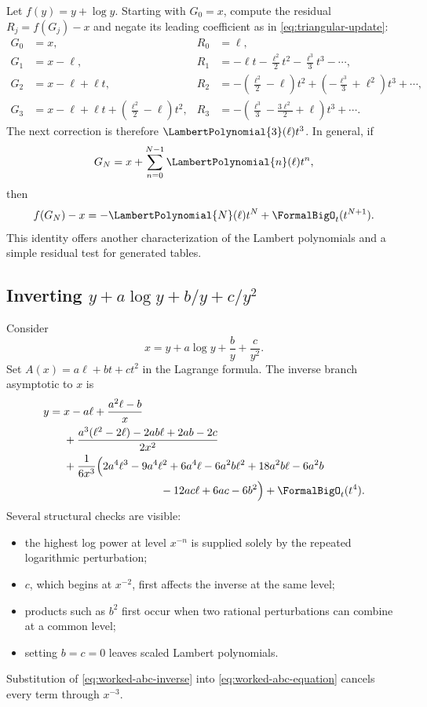 \documentclass[11pt,oneside]{article}
\numberwithin{equation}{section}
\theoremstyle{definition}
\begin{document}
Let \(f(y)=y+\log y\).  Starting with \(G_0=x\), compute the residual
\(R_j=f(G_j)-x\) and negate its leading coefficient as in
\eqref{eq:triangular-update}:
\begin{align*}
 G_0&=x,
 &R_0&=\ell,\\
 G_1&=x-\ell,
 &R_1&=-\ell t-\frac{\ell^2}{2}t^2-\frac{\ell^3}{3}t^3-\cdots,\\
 G_2&=x-\ell+\ell t,
 &R_2&=-\left(\frac{\ell^2}{2}-\ell\right)t^2
      +\left(-\frac{\ell^3}{3}+\ell^2\right)t^3+\cdots,\\
 G_3&=x-\ell+\ell t+
       \left(\frac{\ell^2}{2}-\ell\right)t^2,
 &R_3&=-\left(\frac{\ell^3}{3}-\frac{3\ell^2}{2}+\ell\right)t^3
      +\cdots.
\end{align*}
The next correction is therefore \(\LambertPolynomial{3}(\ell)t^3\).  In general, if
\[
  G_N=x+\sum_{n=0}^{N-1}\LambertPolynomial{n}(\ell)t^n,
\]
then
\begin{equation}\label{eq:Lambert-residual-staircase}
  f(G_N)-x=-\LambertPolynomial{N}(\ell)t^N+\FormalBigO_t(t^{N+1}).
\end{equation}
This identity offers another characterization of the Lambert polynomials and a
simple residual test for generated tables.

\subsection{Inverting \(y+a\log y+b/y+c/y^2\)}

Consider
\begin{equation}\label{eq:worked-abc-equation}
  x=y+a\log y+\frac{b}{y}+\frac{c}{y^2}.
\end{equation}
Set \(A(x)=a\ell+bt+ct^2\) in the Lagrange formula.  The inverse branch
asymptotic to \(x\) is
\begin{align}
 y={}&x-a\ell
 +\frac{a^2\ell-b}{x}\nonumber\\
 &+\frac{a^3(\ell^2-2\ell)-2ab\ell+2ab-2c}{2x^2}
 \nonumber\\
 &+\frac{1}{6x^3}\Bigl(
 2a^4\ell^3-9a^4\ell^2+6a^4\ell
 -6a^2b\ell^2+18a^2b\ell-6a^2b\nonumber\\
 &\hspace{31mm}-12ac\ell+6ac-6b^2\Bigr)
 +\FormalBigO_t(t^4).
 \label{eq:worked-abc-inverse}
\end{align}
Several structural checks are visible:
\begin{itemize}
\item the highest log power at level \(x^{-n}\) is supplied solely by the
  repeated logarithmic perturbation;
\item \(c\), which begins at \(x^{-2}\), first affects the inverse at the same
  level;
\item products such as \(b^2\) first occur when two rational perturbations can
  combine at a common level;
\item setting \(b=c=0\) leaves scaled Lambert polynomials.
\end{itemize}
Substitution of \eqref{eq:worked-abc-inverse} into
\eqref{eq:worked-abc-equation} cancels every term through \(x^{-3}\).
\end{document}
